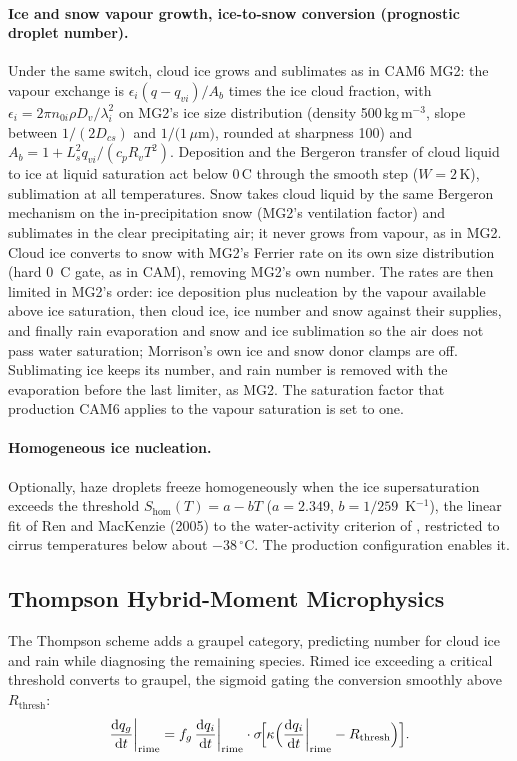 \documentclass[11pt,twoside]{report}
\newcommand{\dd}{\mathrm{d}}
\begin{document}
\paragraph{Ice and snow vapour growth, ice-to-snow conversion (prognostic droplet number).}
Under the same switch, cloud ice grows and sublimates as in CAM6 MG2: the
vapour exchange is $\epsilon_i(q-q_{vi})/A_b$ times the ice cloud fraction, with
$\epsilon_i=2\pi n_{0i}\rho D_v/\lambda_i^2$ on MG2's ice size distribution
(density 500\,kg\,m$^{-3}$, slope between $1/(2D_{cs})$ and $1/(1\,\mu$m$)$,
rounded at sharpness 100) and $A_b=1+L_s^2q_{vi}/(c_pR_vT^2)$.  Deposition and
the Bergeron transfer of cloud liquid to ice at liquid saturation act below
0\,\textdegree C through the smooth step ($W=2$\,K), sublimation at all
temperatures.  Snow takes cloud liquid by the same Bergeron mechanism on the
in-precipitation snow (MG2's ventilation factor) and sublimates in the clear
precipitating air; it never grows from vapour, as in MG2.  Cloud ice converts
to snow with MG2's Ferrier rate on its own size distribution (hard 0\,\textdegree
C gate, as in CAM), removing MG2's own number.  The rates are then limited in
MG2's order: ice deposition plus nucleation by the vapour available above ice
saturation, then cloud ice, ice number and snow against their supplies, and
finally rain evaporation and snow and ice sublimation so the air does not pass
water saturation; Morrison's own ice and snow donor clamps are off.  Sublimating
ice keeps its number, and rain number is removed with the evaporation before
the last limiter, as MG2.  The saturation factor that production CAM6 applies
to the vapour saturation is set to one.

\paragraph{Homogeneous ice nucleation.}
Optionally, haze droplets freeze homogeneously when the ice supersaturation
exceeds the threshold
$S_{\mathrm{hom}}(T)=a-bT$ ($a=2.349$, $b=1/259$~K$^{-1}$), the
linear fit of Ren and MacKenzie (2005) to the water-activity criterion of
\citet{Koop2000}, restricted to cirrus temperatures below about
$-38\,^\circ$C.  The production configuration enables it.

\subsection{Thompson Hybrid-Moment Microphysics}

The Thompson scheme \citep{Thompson2008} adds a graupel category, predicting
number for cloud ice and rain while diagnosing the remaining species. Rimed
ice exceeding a critical threshold converts to graupel, the sigmoid gating
the conversion smoothly above $R_{\mathrm{thresh}}$:
\begin{equation}
  \frac{\dd q_g}{\dd t}\bigg|_{\mathrm{rime}}
  = f_g\,\frac{\dd q_i}{\dd t}\bigg|_{\mathrm{rime}}
  \cdot\sigma\!\Bigl[\kappa\Bigl(\frac{\dd q_i}{\dd t}\bigg|_{\mathrm{rime}}
  - R_{\mathrm{thresh}}\Bigr)\Bigr].
\end{equation}
\end{document}
